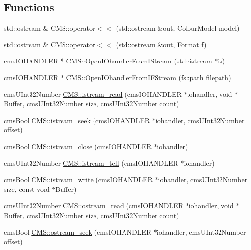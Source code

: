 \subsection*{Functions}
\begin{DoxyCompactItemize}
\item 
std\+::ostream \& \hyperlink{namespace_c_m_s_aebe3bd3845d84746f27134435fcaadbe}{C\+M\+S\+::operator$<$$<$} (std\+::ostream \&out, Colour\+Model model)
\item 
std\+::ostream \& \hyperlink{namespace_c_m_s_a0d812bc6465a5fef515e13517dbb14c4}{C\+M\+S\+::operator$<$$<$} (std\+::ostream \&out, Format f)
\item 
cms\+I\+O\+H\+A\+N\+D\+L\+ER $\ast$ \hyperlink{namespace_c_m_s_a618226eaa9bf97c8c23669c516be6d4e}{C\+M\+S\+::\+Open\+I\+Ohandler\+From\+I\+Stream} (std\+::istream $\ast$is)
\item 
cms\+I\+O\+H\+A\+N\+D\+L\+ER $\ast$ \hyperlink{namespace_c_m_s_ad1b15f2bd898c5c4e96ab247fb26575c}{C\+M\+S\+::\+Open\+I\+Ohandler\+From\+I\+F\+Stream} (fs\+::path filepath)
\item 
cms\+U\+Int32\+Number \hyperlink{namespace_c_m_s_a88c40f3fde62e521d5f3b4055e6854e6}{C\+M\+S\+::istream\+\_\+read} (cms\+I\+O\+H\+A\+N\+D\+L\+ER $\ast$iohandler, void $\ast$Buffer, cms\+U\+Int32\+Number size, cms\+U\+Int32\+Number count)
\item 
cms\+Bool \hyperlink{namespace_c_m_s_a55b53b00daedc8b76eba456e43713dd6}{C\+M\+S\+::istream\+\_\+seek} (cms\+I\+O\+H\+A\+N\+D\+L\+ER $\ast$iohandler, cms\+U\+Int32\+Number offset)
\item 
cms\+Bool \hyperlink{namespace_c_m_s_a60036a5e1db6c4320d3ce599758c9101}{C\+M\+S\+::istream\+\_\+close} (cms\+I\+O\+H\+A\+N\+D\+L\+ER $\ast$iohandler)
\item 
cms\+U\+Int32\+Number \hyperlink{namespace_c_m_s_a9e1e064622cf44c9e8958a37c0bae3e4}{C\+M\+S\+::istream\+\_\+tell} (cms\+I\+O\+H\+A\+N\+D\+L\+ER $\ast$iohandler)
\item 
cms\+Bool \hyperlink{namespace_c_m_s_a3562813bdb675436999b19d1b51a986f}{C\+M\+S\+::istream\+\_\+write} (cms\+I\+O\+H\+A\+N\+D\+L\+ER $\ast$iohandler, cms\+U\+Int32\+Number size, const void $\ast$Buffer)
\item 
cms\+U\+Int32\+Number \hyperlink{namespace_c_m_s_ac7b7b13d2c01af24cbf3fa7587e24c23}{C\+M\+S\+::ostream\+\_\+read} (cms\+I\+O\+H\+A\+N\+D\+L\+ER $\ast$iohandler, void $\ast$Buffer, cms\+U\+Int32\+Number size, cms\+U\+Int32\+Number count)
\item 
cms\+Bool \hyperlink{namespace_c_m_s_a42537c0a11f8f118b0380d202ff24430}{C\+M\+S\+::ostream\+\_\+seek} (cms\+I\+O\+H\+A\+N\+D\+L\+ER $\ast$iohandler, cms\+U\+Int32\+Number offset)

\end{DoxyCompactItemize}
